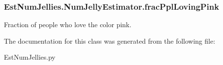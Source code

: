 \subsubsection[{frac\+Ppl\+Loving\+Pink}]{\setlength{\rightskip}{0pt plus 5cm}Est\+Num\+Jellies.\+Num\+Jelly\+Estimator.\+frac\+Ppl\+Loving\+Pink}\label{class_est_num_jellies_1_1_num_jelly_estimator_adf6fe4e805106a7316b3202cc5c3470e}


Fraction of people who love the color pink. 



The documentation for this class was generated from the following file\+:\begin{DoxyCompactItemize}
\item 
Est\+Num\+Jellies.\+py\end{DoxyCompactItemize}
